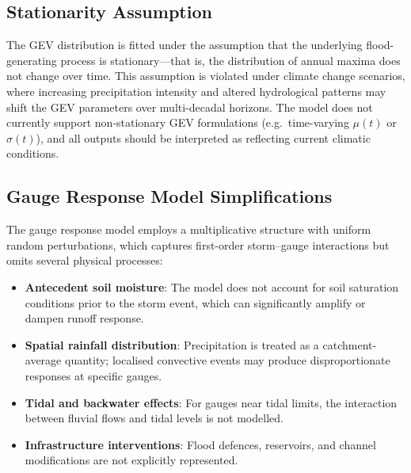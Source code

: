 \documentclass[11pt,a4paper]{article}
\begin{document}
\clearpage

\mkmlimitations

\subsection{Stationarity Assumption}

The GEV distribution is fitted under the assumption that the underlying flood-generating process is stationary---that is, the distribution of annual maxima does not change over time. This assumption is violated under climate change scenarios, where increasing precipitation intensity and altered hydrological patterns may shift the GEV parameters over multi-decadal horizons. The model does not currently support non-stationary GEV formulations (e.g.\ time-varying $\mu(t)$ or $\sigma(t)$), and all outputs should be interpreted as reflecting current climatic conditions.

\subsection{Gauge Response Model Simplifications}

The gauge response model employs a multiplicative structure with uniform random perturbations, which captures first-order storm--gauge interactions but omits several physical processes:

\begin{itemize}
    \item \textbf{Antecedent soil moisture}: The model does not account for soil saturation conditions prior to the storm event, which can significantly amplify or dampen runoff response.
    \item \textbf{Spatial rainfall distribution}: Precipitation is treated as a catchment-average quantity; localised convective events may produce disproportionate responses at specific gauges.
    \item \textbf{Tidal and backwater effects}: For gauges near tidal limits, the interaction between fluvial flows and tidal levels is not modelled.
    \item \textbf{Infrastructure interventions}: Flood defences, reservoirs, and channel modifications are not explicitly represented.
\end{itemize}
\end{document}
